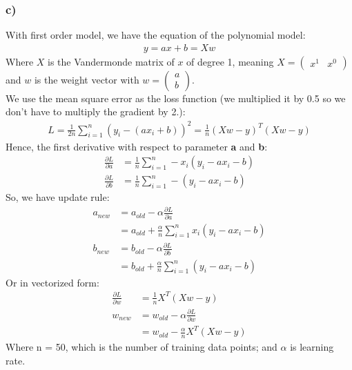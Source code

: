 \documentclass{article}
\begin{document}
\subsubsection*{c)}
With first order model, we have the equation of the polynomial model:
\begin{align*}
y = ax + b = X w
\end{align*}
Where $X$ is the Vandermonde matrix of $x$ of degree 1, meaning $X = \begin{pmatrix*}x^1 & x^0\end{pmatrix*}$ and $w$ is the weight vector with $w = \begin{pmatrix*} a \\ b \end{pmatrix*}$.\\
We use the mean square error as the loss function (we multiplied it by 0.5 so we don't have to multiply the gradient by 2.):
\begin{align*}
L = \frac{1}{2n}\sum\limits_{i=1}^{n}(y_{i} - (ax_{i} +b))^2 = \frac{1}{n}(Xw - y)^T (Xw - y)
\end{align*}
Hence, the first derivative with respect to parameter \textbf{a} and \textbf{b}:
\begin{align*}
\frac{\partial L}{\partial a} &= \frac{1}{n}\sum\limits_{i=1}^{n}-x_i(y_i - ax_i - b)\\
\frac{\partial L}{\partial b} &= \frac{1}{n}\sum\limits_{i=1}^{n}-(y_i - ax_i - b)
\end{align*}
So, we have update rule:
\begin{align*}
a_{new} &= a_{old} - \alpha\frac{\partial L}{\partial a}\\
&= a_{old} + \frac{\alpha}{n}\sum\limits_{i=1}^{n}x_i(y_i - ax_i - b)\\
b_{new} &= b_{old} - \alpha\frac{\partial L}{\partial b}\\
&= b_{old} + \frac{\alpha}{n}\sum\limits_{i=1}^{n}(y_i - ax_i - b)
\end{align*}
Or in vectorized form:\\
\begin{align*}
\frac{\partial L}{\partial w} &= \frac{1}{n} X^T(Xw - y) \\
w_{new} &= w_{old} - \alpha \frac{\partial L}{\partial w} \\
&= w_{old} - \frac{\alpha}{n} X^T(Xw - y)
\end{align*}
Where n = 50, which is the number of training data points; and $\alpha$ is learning rate.
\end{document}

